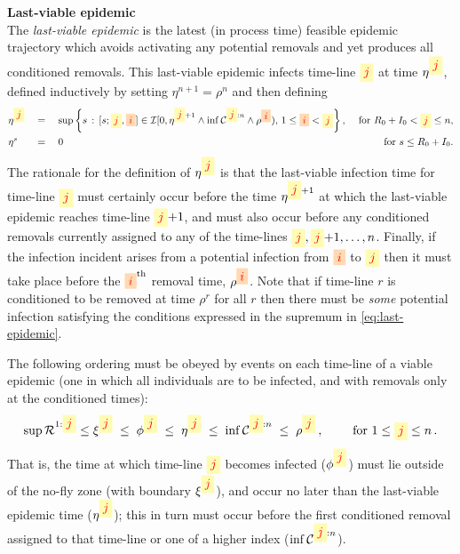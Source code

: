 \documentclass[]{article}
\newcommand{\Infections}{\mathcal{I}}
\newcommand{\Conditioned}{\mathcal{C}}
\newcommand{\Removals}{\mathcal{R}}
\newcommand{\infectee}{{\colorbox{yellow!30}{$\textcolor{red}{j}$}}}
\newcommand{\infector}{{\colorbox{orange!30}{$\textcolor{red}{i}$}}}
\begin{document}
\medskip
\noindent \textbf{Last-viable epidemic}\\
The \emph{last-viable epidemic} is the latest (in process time) feasible epidemic trajectory which 
avoids activating
any potential removals and 
yet produces all conditioned removals.
This last-viable epidemic infects time-line \(\infectee\)
at time \(\eta^\infectee\), defined inductively by
setting \(\eta^{n+1}=\rho^n\) and then defining
 \begin{equation}
\begin{aligned}
 &\eta^\infectee &&=\quad
\sup\left\{s\,:\,
[s;\infectee,\infector]\in
\Infections[0, \eta^{\infectee{+}1} \wedge \inf\Conditioned^{\infectee:n}\wedge 
\rho^\infector ),\,1\le \infector<\infectee\right\} ,
& \text{ for }R_0+I_0<\infectee\le n, 
\\
 &\eta^s &&=\quad 0 
& \text{ for }s\leq R_0+I_0.
 \end{aligned}  
\label{eq:last-epidemic} 
 \end{equation}
 The rationale for the definition of \(\eta^\infectee\) is that
 the last-viable infection time for time-line \(\infectee\) must certainly occur
 before the time 
 \(\eta^{\infectee{+}1}\)
 at which the last-viable epidemic reaches time-line \(\infectee{+}1\),
 and must also occur before any conditioned removals currently assigned to
 any of the time-lines \(\infectee,\infectee{+}1,\dots,n\).
 Finally, if the infection incident arises from a potential infection from \(\infector\)
 to \(\infectee\)
 then
 it must take place before the \(\infector^\text{th}\) removal time, \(\rho^\infector\).
 Note that if time-line \(r\) is conditioned to be removed at time 
 \(\rho^r\) for all \(r\) then there must be \emph{some} potential infection
 satisfying the conditions expressed in 
 the supremum in \eqref{eq:last-epidemic}. 

 
\medskip
The following ordering must be obeyed by events on each
time-line of a viable epidemic 
(one in which all individuals are to be infected, and with removals only at the conditioned times):
\begin{equation}\label{eq:event-order}
\sup\Removals^{1:\infectee} \le \xi^\infectee
\;\le\; \phi^\infectee
\;\le\; \eta^\infectee 
\;\le\; \inf\Conditioned^{\infectee:n} 
\;\le\; \rho^\infectee 
\,, \qquad \text{ for } 1\le \infectee\le n \,.
\end{equation}
That is, the time at which time-line \(\infectee\) becomes infected
(\(\phi^\infectee\)) must lie outside of the no-fly zone (with boundary
\(\xi^\infectee\)), and occur no later than the last-viable epidemic time
(\(\eta^\infectee\)); this in turn must occur before the first
conditioned removal assigned to that time-line or one of a higher index 
(\(\inf\Conditioned^{\infectee:n}\)). 
\end{document}
